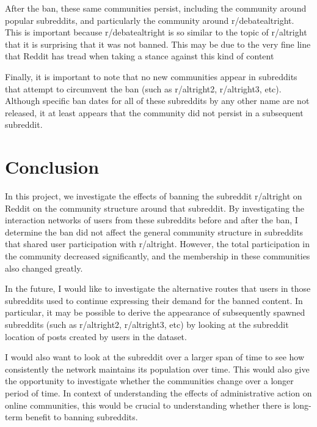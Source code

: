 \documentclass[twoside,twocolumn]{article}
\begin{document}
After the ban, these same communities persist, including the community around popular subreddits, and particularly the community around r/debatealtright. This is important because r/debatealtright is so similar to the topic of r/altright that it is surprising that it was not banned. This may be due to the very fine line that Reddit has tread when taking a stance against this kind of content \cite{banaltright}

Finally, it is important to note that no new communities appear in subreddits that attempt to circumvent the ban (such as r/altright2, r/altright3, etc). Although specific ban dates for all of these subreddits by any other name are not released, it at least appears that the community did not persist in a subsequent subreddit. 

\section{Conclusion}

In this project, we investigate the effects of banning the subreddit r/altright on Reddit on the community structure around that subreddit. By investigating the interaction networks of users from these subreddits before and after the ban, I determine the ban did not affect the general community structure in subreddits that shared user participation with r/altright. However, the total participation in the community decreased significantly, and the membership in these communities also changed greatly. 

In the future, I would like to investigate the alternative routes that users in those subreddits used to continue expressing their demand for the banned content. In particular, it may be possible to derive the appearance of subsequently spawned subreddits (such as r/altright2, r/altright3, etc) by looking at the subreddit location of posts created by users in the dataset. 

I would also want to look at the subreddit over a larger span of time to see how consistently the network maintains its population over time. This would also give the opportunity to investigate whether the communities change over a longer period of time. In context of understanding the effects of administrative action on online communities, this would be crucial to understanding whether there is long-term benefit to banning subreddits. 



\end{document}
